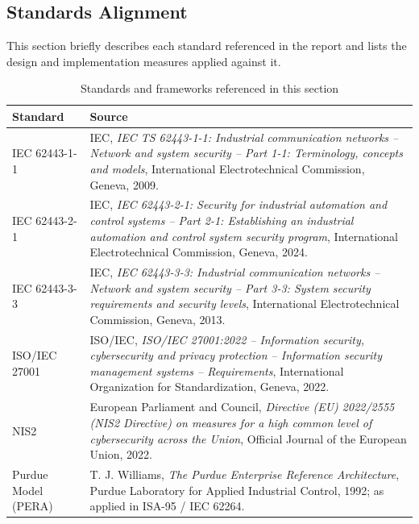 \documentclass[11pt,a4paper]{article}
\begin{document}
\subsection{Standards Alignment}
This section briefly describes each standard referenced in the report and lists
the design and implementation measures applied against it.
\begin{table}[h]
\centering
\begin{tabular}{p{4cm} p{11.5cm}}
\textbf{Standard} & \textbf{Source} \\
    \toprule
    IEC 62443-1-1 & IEC, \textit{IEC TS 62443-1-1: Industrial communication
    networks -- Network and system security -- Part 1-1: Terminology, concepts
    and models}, International Electrotechnical Commission, Geneva, 2009. \\
    \midrule

    IEC 62443-2-1 & IEC, \textit{IEC 62443-2-1: Security for industrial
    automation and control systems -- Part 2-1: Establishing an industrial
    automation and control system security program}, International
    Electrotechnical Commission, Geneva, 2024. \\
    \midrule

    IEC 62443-3-3 & IEC, \textit{IEC 62443-3-3: Industrial communication
    networks -- Network and system security -- Part 3-3: System security
    requirements and security levels}, International Electrotechnical
    Commission, Geneva, 2013. \\
    \midrule

    ISO/IEC 27001 & ISO/IEC, \textit{ISO/IEC 27001:2022 -- Information
    security, cybersecurity and privacy protection -- Information security
    management systems -- Requirements}, International Organization for
    Standardization, Geneva, 2022. \\
    \midrule

    NIS2 & European Parliament and Council, \textit{Directive (EU) 2022/2555
    (NIS2 Directive) on measures for a high common level of cybersecurity
    across the Union}, Official Journal of the European Union, 2022. \\ 
    \midrule

    Purdue Model (PERA) & T. J. Williams, \textit{The Purdue Enterprise
    Reference Architecture}, Purdue Laboratory for Applied Industrial Control,
    1992; as applied in ISA-95 / IEC 62264. \\
    \midrule
\end{tabular}
\caption{Standards and frameworks referenced in this section}
\end{table}
\end{document}
